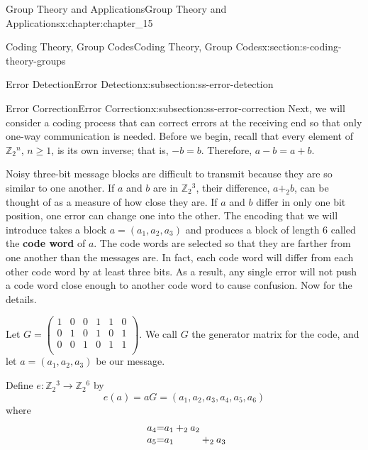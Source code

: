 \documentclass[oneside,10pt,]{book}
\newcommand{\terminology}[1]{\textbf{#1}}
\numberwithin{equation}{section}
\begin{document}
\begin{chapterptx}{Group Theory and Applications}{}{Group Theory and Applications}{}{}{x:chapter:chapter_15}
\begin{sectionptx}{Coding Theory, Group Codes}{}{Coding Theory, Group Codes}{}{}{x:section:s-coding-theory-groups}
\begin{subsectionptx}{Error Detection}{}{Error Detection}{}{}{x:subsection:ss-error-detection}
\end{subsectionptx}
%
%
\typeout{************************************************}
\typeout{************************************************}
%
\begin{subsectionptx}{Error Correction}{}{Error Correction}{}{}{x:subsection:ss-error-correction}
Next, we will consider a coding process that can correct errors at the receiving end so that only one-way communication is needed. Before we begin, recall that every element of \(\mathbb{Z}_2{}^n\), \(n \geq  1\), is its own inverse; that is, \(-b = b\). Therefore, \(a - b = a + b\).%
\par
Noisy three-bit message blocks are difficult to transmit because they are so similar to one another. If \(a\) and \(b\) are in \(\mathbb{Z}_2{}^3\), their difference, \(a +_2 b\), can be thought of as a measure of how close they are. If \(a\) and \(b\) differ in only one bit position, one error can change one into the other. The encoding that we will introduce takes a block \(a = \left(a_1, a_2, a_3 \right)\) and produces a block of length 6 called the \terminology{code word} of \(a\). The code words are selected so that they are farther from one another than the messages are. In fact, each code word will differ from each other code word by at least three bits. As a result, any single error will not push a code word close enough to another code word to cause confusion. Now for the details.%
\par
Let \(G=\left(
\begin{array}{cccccc}
1 & 0 & 0 & 1 & 1 & 0 \\
0 & 1 & 0 & 1 & 0 & 1 \\
0 & 0 & 1 & 0 & 1 & 1 \\
\end{array}
\right)\).  We call \(G\) the generator matrix  for the code, and let \(a = \left(a_1, a_2, a_3 \right)\) be our message.%
\par
Define \(e : \mathbb{Z}_2{}^3 \to \mathbb{Z}_2{}^6\) by%
\begin{equation*}
e(a) = a G = \left(a_1, a_2, a_3,a_4, a_5, a_6\right)
\end{equation*}
where%
\begin{equation*}
\begin{array}{r@{}r@{}r@{}r@{}r@{}r@{}r@{}}
a_4  &= & a_1 &  {}+_2{}     &  a_2  &       &        \\
a_5  &= & a_1 &              &       &{}+_2{}  & a_3  \\

\end{array}
\end{equation*}
\end{subsectionptx}
\end{sectionptx}
\end{chapterptx}
\end{document}
